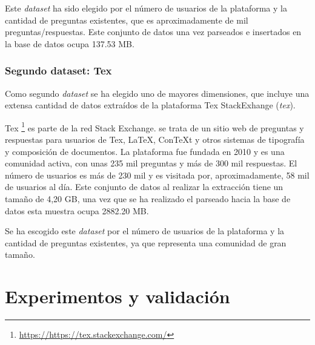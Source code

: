\documentclass[a4paper, 12pt]{book}
\begin{document}
Este \textit{dataset} ha sido elegido por el número de usuarios de la plataforma y la cantidad de preguntas existentes, que es aproximadamente de mil preguntas/respuestas. Este conjunto de datos una vez parseados e insertados en la base de datos ocupa 137.53 MB.  


\subsection{Segundo dataset: Tex}
\label{sec:tex} 
Como segundo \textit{dataset} se ha elegido uno de mayores dimensiones, que incluye una extensa cantidad de datos extraídos de la plataforma Tex StackExhange (\emph{tex}).

Tex \footnote{\url{https://https://tex.stackexchange.com/}} es parte de la red Stack Exchange. se trata de un sitio web de preguntas y respuestas para usuarios de Tex, LaTeX, ConTeXt y otros sistemas de tipografía y composición de documentos. La plataforma fue fundada en 2010 y es una comunidad activa, con unas 235 mil preguntas y más de 300 mil respuestas. El número de usuarios es más de 230 mil y es visitada por, aproximadamente, 58 mil de usuarios al día.
Este conjunto de datos al realizar la extracción tiene un tamaño de 4,20 GB, una vez que se ha realizado el parseado hacia la base de datos esta muestra ocupa 2882.20 MB.

Se ha escogido este \textit{dataset} por el número de usuarios de la plataforma y la cantidad de preguntas existentes, ya que representa una comunidad de gran tamaño. 

\cleardoublepage


\chapter{Experimentos y validación}
\label{chap:experimentos}
\end{document}
